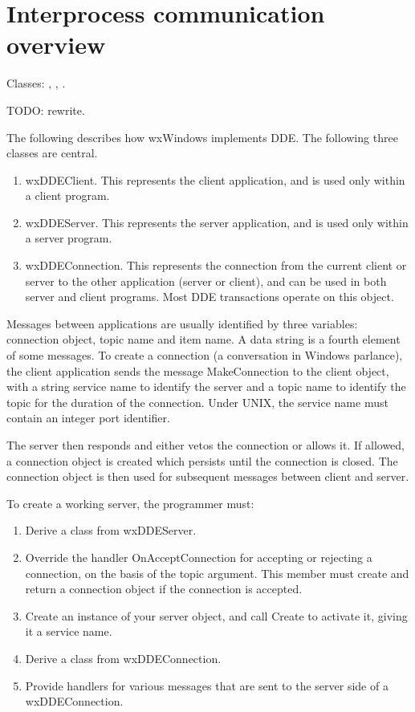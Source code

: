 \section{Interprocess communication overview}\label{ipcoverview}

Classes: , ,
\rtfsp{}.

TODO: rewrite.

The following describes how wxWindows implements DDE.  The following
three classes are central.

\begin{enumerate}\itemsep=0pt
\item wxDDEClient. This represents the client application, and is used
only within a client program.
\item wxDDEServer. This represents the server application, and is used
only within a server program.
\item wxDDEConnection. This represents the connection from the current
client or server to the other application (server or client), and can be used
in both server and client programs. Most DDE
transactions operate on this object.
\end{enumerate}

Messages between applications are usually identified by three variables:
connection object, topic name and item name.  A data string is a fourth
element of some messages. To create a connection (a conversation in
Windows parlance), the client application sends the message
MakeConnection to the client object, with a string service name to
identify the server and a topic name to identify the topic for the
duration of the connection. Under UNIX, the service name must contain an
integer port identifier.

The server then responds and either vetos the connection or allows it.
If allowed, a connection object is created which persists until the
connection is closed.  The connection object is then used for subsequent
messages between client and server.

To create a working server, the programmer must:

\begin{enumerate}\itemsep=0pt
\item Derive a class from wxDDEServer.
\item Override the handler OnAcceptConnection for accepting or rejecting a connection,
on the basis of the topic argument. This member must create and return a connection
object if the connection is accepted.
\item Create an instance of your server object, and call Create to
activate it, giving it a service name.
\item Derive a class from wxDDEConnection.
\item Provide handlers for various messages that are sent to the server
side of a wxDDEConnection.
\end{enumerate}

